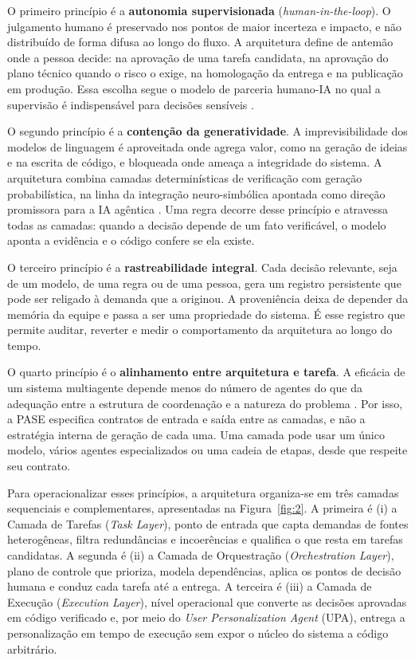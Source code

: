 O primeiro princípio é a \textbf{autonomia supervisionada} (\textit{human-in-the-loop}). O julgamento humano é preservado nos pontos de maior incerteza e impacto, e não distribuído de forma difusa ao longo do fluxo. A arquitetura define de antemão onde a pessoa decide: na aprovação de uma tarefa candidata, na aprovação do plano técnico quando o risco o exige, na homologação da entrega e na publicação em produção. Essa escolha segue o modelo de parceria humano-IA no qual a supervisão é indispensável para decisões sensíveis \cite{burte2025sdlc}.

O segundo princípio é a \textbf{contenção da generatividade}. A imprevisibilidade dos modelos de linguagem é aproveitada onde agrega valor, como na geração de ideias e na escrita de código, e bloqueada onde ameaça a integridade do sistema. A arquitetura combina camadas determinísticas de verificação com geração probabilística, na linha da integração neuro-simbólica apontada como direção promissora para a IA agêntica \cite{abouali2025agentic}. Uma regra decorre desse princípio e atravessa todas as camadas: quando a decisão depende de um fato verificável, o modelo aponta a evidência e o código confere se ela existe.

O terceiro princípio é a \textbf{rastreabilidade integral}. Cada decisão relevante, seja de um modelo, de uma regra ou de uma pessoa, gera um registro persistente que pode ser religado à demanda que a originou. A proveniência deixa de depender da memória da equipe e passa a ser uma propriedade do sistema. É esse registro que permite auditar, reverter e medir o comportamento da arquitetura ao longo do tempo.

O quarto princípio é o \textbf{alinhamento entre arquitetura e tarefa}. A eficácia de um sistema multiagente depende menos do número de agentes do que da adequação entre a estrutura de coordenação e a natureza do problema \cite{kim2026scaling}. Por isso, a PASE especifica contratos de entrada e saída entre as camadas, e não a estratégia interna de geração de cada uma. Uma camada pode usar um único modelo, vários agentes especializados ou uma cadeia de etapas, desde que respeite seu contrato.

Para operacionalizar esses princípios, a arquitetura organiza-se em três camadas sequenciais e complementares, apresentadas na Figura~\ref{fig:2}. A primeira é (i) a Camada de Tarefas (\textit{Task Layer}), ponto de entrada que capta demandas de fontes heterogêneas, filtra redundâncias e incoerências e qualifica o que resta em tarefas candidatas. A segunda é (ii) a Camada de Orquestração (\textit{Orchestration Layer}), plano de controle que prioriza, modela dependências, aplica os pontos de decisão humana e conduz cada tarefa até a entrega. A terceira é (iii) a Camada de Execução (\textit{Execution Layer}), nível operacional que converte as decisões aprovadas em código verificado e, por meio do \textit{User Personalization Agent} (UPA), entrega a personalização em tempo de execução sem expor o núcleo do sistema a código arbitrário.


